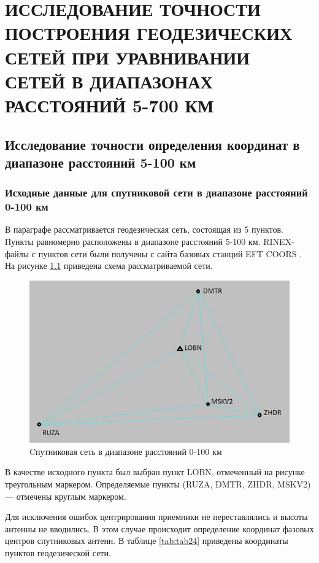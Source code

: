 \chapter{ИССЛЕДОВАНИЕ ТОЧНОСТИ ПОСТРОЕНИЯ ГЕОДЕЗИЧЕСКИХ СЕТЕЙ ПРИ УРАВНИВАНИИ СЕТЕЙ В ДИАПАЗОНАХ РАССТОЯНИЙ 5-700 КМ}\label{ch:ch3}

\section{Исследование точности определения координат в диапазоне расстояний 5-100 км}\label{sec:ch3/sect1}

\subsection{Исходные данные для спутниковой сети в диапазоне расстояний 0-100 км}\label{subsec:ch3/sec1/sub1}

В параграфе рассматривается геодезическая сеть, состоящая из 5 пунктов. Пункты равномерно расположены в диапазоне расстояний 5-100 км. RINEX-файлы с пунктов сети были получены с сайта базовых станций EFT COORS \cite{src55}. На рисунке \cref{fig:pic25}  приведена схема рассматриваемой сети.


\begin{figure}[!h]
	\centering
	\includegraphics[width=0.99\linewidth]{images/pic25}
	\caption{Cпутниковая сеть в диапазоне расстояний 0-100 км }
	\label{fig:pic25}
\end{figure}

В качестве исходного пункта был выбран пункт LOBN, отмеченный на рисунке треугольным маркером. Определяемые пункты (RUZA, DMTR, ZHDR, MSKV2) --- отмечены круглым маркером.

Для исключения ошибок центрирования приемники не переставлялись и высоты антенны не вводились. В этом случае происходит определение координат фазовых центров спутниковых антенн. В таблице \cref{tab:tab24} приведены координаты пунктов геодезической сети.

